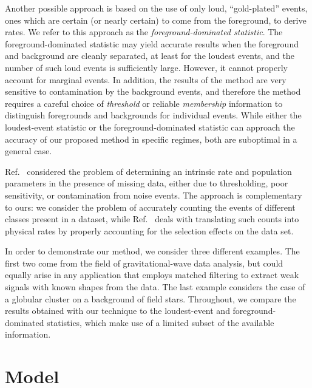 \documentclass[aps,prd,reprint,nofootinbib]{revtex4-1}
\begin{document}
Another possible approach is based on the use of only loud,
``gold-plated'' events, ones which are certain (or nearly certain) to
come from the foreground, to derive rates.  We refer to this approach
as the \emph{foreground-dominated statistic}.  The
foreground-dominated statistic may yield accurate results when the
foreground and background are cleanly separated, at least for the
loudest events, and the number of such loud events is sufficiently
large.  However, it cannot properly account for marginal events.  In
addition, the results of the method are very sensitive to
contamination by the background events, and therefore the method
requires a careful choice of \emph{threshold} or reliable
\emph{membership} information to distinguish foregrounds and
backgrounds for individual events.  While either the loudest-event
statistic or the foreground-dominated statistic can approach the
accuracy of our proposed method in specific regimes, both are
suboptimal in a general case.

Ref.~\cite{Messenger2012} considered the problem of determining an
intrinsic rate and population parameters in the presence of missing
data, either due to thresholding, poor sensitivity, or contamination
from noise events.  The approach is complementary to ours: we consider
the problem of accurately counting the events of different classes
present in a dataset, while Ref.~\cite{Messenger2012} deals with
translating such counts into physical rates by properly accounting for
the selection effects on the data set.  

In order to demonstrate our method, we consider three different
examples.  The first two come from the field of gravitational-wave
data analysis, but could equally arise in any application that employs
matched filtering \cite{findchirppaper} to extract weak signals with
known shapes from the data.  The last example considers the case of a
globular cluster on a background of field stars.  Throughout, we
compare the results obtained with our technique to the loudest-event
and foreground-dominated statistics, which make use of a limited
subset of the available information.

\section{Model}\label{sec:model}
\end{document}

